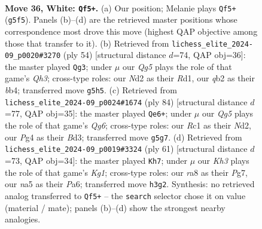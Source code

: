 \documentclass[11pt]{article}
\begin{document}
\clearpage

\begin{figure}[p]\centering
\begin{subfigure}{0.46\textwidth}\centering
\resizebox{\linewidth}{!}{%
\newchessgame
\chessboard[
  setfen={r6r/p5pp/3bk3/n2p2Q1/p2P2PP/4P2K/1q1N4/2R5 w - - 4 36},
  showmover=false,
  pgfstyle=straightmove, color=movearrow, markmove={g5-f5}
]}
\caption{}
\end{subfigure}\hfill
\begin{subfigure}{0.46\textwidth}\centering
\resizebox{\linewidth}{!}{%
\newchessgame
\chessboard[
  setfen={4r1k1/1p1b1rpp/pB2p3/8/1bP5/1P5Q/P5PP/3R3K w - - 1 28},
  showmover=false,
  pgfstyle=straightmove, color=movearrow, markmove={h3-g3}
]}
\caption{}
\end{subfigure}
\\[4pt]
\begin{subfigure}{0.46\textwidth}\centering
\resizebox{\linewidth}{!}{%
\newchessgame
\chessboard[
  setfen={1b3rk1/6p1/2p3Qp/2P5/p7/3B2P1/3N1PPK/2q5 w - - 18 43},
  showmover=false,
  pgfstyle=straightmove, color=movearrow, markmove={g6-e6}
]}
\caption{}
\end{subfigure}\hfill
\begin{subfigure}{0.46\textwidth}\centering
\resizebox{\linewidth}{!}{%
\newchessgame
\chessboard[
  setfen={6k1/1Q3pp1/p2Bp2p/P2n1q2/n2P3P/6P1/3r1P2/2R2RK1 b - - 2 31},
  showmover=false,
  pgfstyle=straightmove, color=movearrow, markmove={g8-h7}
]}
\caption{}
\end{subfigure}
\caption{\textbf{Move 36, White: \texttt{Qf5+}.} (a) Our position; Melanie plays \texttt{Qf5+} (\texttt{g5f5}). Panels (b)--(d) are the retrieved master positions whose correspondence most drove this move (highest QAP objective among those that transfer to it). (b) Retrieved from \texttt{lichess\_elite\_2024-09\_p0020\#3270} (ply 54) [structural distance $d$=74, QAP obj=36]: the master played \texttt{Qg3}; under $\mu$ our \emph{Qg5} plays the role of that game's \emph{Qh3}; cross-type roles: our \emph{N}d2 as their \emph{R}d1, our \emph{q}b2 as their \emph{b}b4; transferred move \texttt{g5h5}. (c) Retrieved from \texttt{lichess\_elite\_2024-09\_p0024\#1674} (ply 84) [structural distance $d$=77, QAP obj=35]: the master played \texttt{Qe6+}; under $\mu$ our \emph{Qg5} plays the role of that game's \emph{Qg6}; cross-type roles: our \emph{R}c1 as their \emph{N}d2, our \emph{P}g4 as their \emph{B}d3; transferred move \texttt{g5g7}. (d) Retrieved from \texttt{lichess\_elite\_2024-09\_p0019\#3324} (ply 61) [structural distance $d$=73, QAP obj=34]: the master played \texttt{Kh7}; under $\mu$ our \emph{Kh3} plays the role of that game's \emph{Kg1}; cross-type roles: our \emph{r}a8 as their \emph{P}g7, our \emph{n}a5 as their \emph{P}a6; transferred move \texttt{h3g2}. Synthesis: no retrieved analog transferred to \texttt{Qf5+} -- the \texttt{search} selector chose it on value (material / mate); panels (b)--(d) show the strongest nearby analogies.}
\label{fig:thought-m70}
\end{figure}
\end{document}
